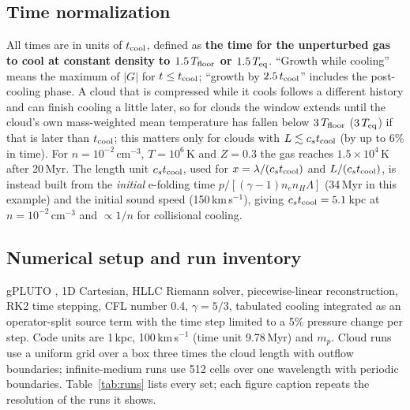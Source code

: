 \documentclass[11pt]{article}
\newcommand{\tcool}{t_{\rm cool}}
\newcommand{\cstc}{c_s t_{\rm cool}}
\newcommand{\Teq}{T_{\rm eq}}
\newcommand{\Tfl}{T_{\rm floor}}
\begin{document}
\subsection{Time normalization}
\label{sec:tnorm}
All times are in units of $\tcool$, defined as \textbf{the time for the
unperturbed gas to cool at constant density to $1.5\,\Tfl$ or $1.5\,\Teq$}.
``Growth while cooling'' means the maximum of $|G|$ for $t\le\tcool$; ``growth
by $2.5\,\tcool$'' includes the post-cooling phase. A cloud that is compressed
while it cools follows a different history and can finish cooling a little
later, so for clouds the window extends until the cloud's own mass-weighted mean
temperature has fallen below $3\,\Tfl$ ($3\,\Teq$) if that is later than
$\tcool$; this matters only for clouds with $L\lesssim\cstc$ (by up to 6\%
in time). For $n=10^{-2}$\,cm$^{-3}$,
$T=10^6$\,K and $Z=0.3$ the gas reaches $1.5\times10^4$\,K after 20\,Myr. The
length unit $\cstc$, used for $x=\lambda/(\cstc)$ and $L/(\cstc)$, is instead
built from the \emph{initial} e-folding time $p/[(\gamma-1)n_en_H\Lambda]$ (34\,Myr
in this example) and the initial sound speed (150\,km\,s$^{-1}$), giving
$\cstc=5.1$\,kpc at $n=10^{-2}$\,cm$^{-3}$ and $\propto1/n$ for collisional cooling.

\subsection{Numerical setup and run inventory}
\label{sec:runs}
gPLUTO \citep{mignone07}, 1D Cartesian, HLLC Riemann solver, piecewise-linear
reconstruction, RK2 time stepping, CFL number 0.4, $\gamma=5/3$, tabulated
cooling integrated as an operator-split source term with the time step limited
to a 5\% pressure change per step. Code units are 1\,kpc, 100\,km\,s$^{-1}$
(time unit 9.78\,Myr) and $m_p$. Cloud runs use a uniform grid over a box three
times the cloud length with outflow boundaries; infinite-medium runs use 512
cells over one wavelength with periodic boundaries. Table~\ref{tab:runs} lists
every set; each figure caption repeats the resolution of the runs it shows.
\end{document}
